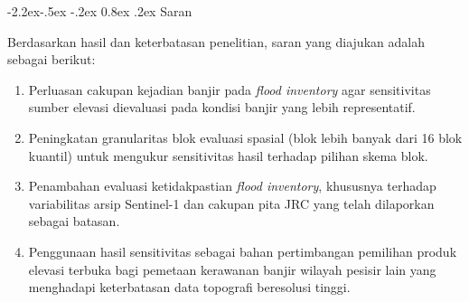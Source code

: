 \documentclass[12pt,a4paper]{article}
\makeatletter
\renewcommand\subsection{\@startsection{subsection}{2}{\z@}%
  {-2.2ex\@plus -.5ex \@minus -.2ex}%
  {0.8ex \@plus .2ex}%
  {\normalfont\normalsize\bfseries}}
\newcommand{\FloatBarrier}{\clearpage}
\makeatother
\begin{document}
\subsection{Saran}

Berdasarkan hasil dan keterbatasan penelitian, saran yang diajukan adalah
sebagai berikut:

\begin{enumerate}
\item Perluasan cakupan kejadian banjir pada \textit{flood inventory} agar
sensitivitas sumber elevasi dievaluasi pada kondisi banjir yang lebih
representatif.
\item Peningkatan granularitas blok evaluasi spasial (blok lebih banyak dari
16 blok kuantil) untuk mengukur sensitivitas hasil terhadap pilihan skema
blok.
\item Penambahan evaluasi ketidakpastian \textit{flood inventory}, khususnya
terhadap variabilitas arsip Sentinel-1 dan cakupan pita JRC yang telah
dilaporkan sebagai batasan.
\item Penggunaan hasil sensitivitas sebagai bahan pertimbangan pemilihan
produk elevasi terbuka bagi pemetaan kerawanan banjir wilayah pesisir lain
yang menghadapi keterbatasan data topografi beresolusi tinggi.
\end{enumerate}

\FloatBarrier

\clearpage
\end{document}
